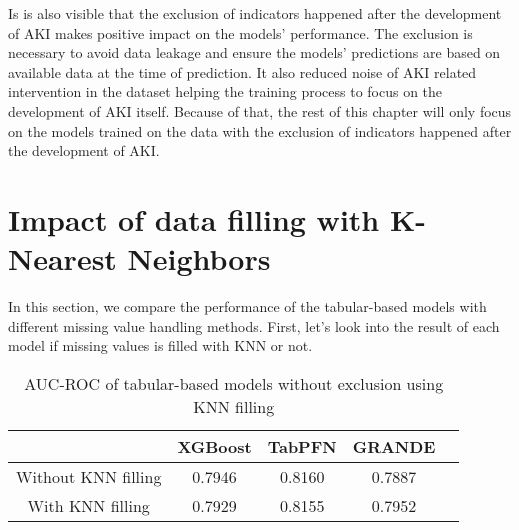 \documentclass[../main.tex]{subfiles}
\begin{document}
Is is also visible that the exclusion of indicators happened after the development of AKI makes positive impact on the models' performance.
The exclusion is necessary to avoid data leakage and ensure the models' predictions are based on available data at the time of prediction.
It also reduced noise of AKI related intervention in the dataset helping the training process to focus on the development of AKI itself.
Because of that, the rest of this chapter will only focus on the models trained on the data with the exclusion of indicators happened after the development of AKI.


\section{Impact of data filling with K-Nearest Neighbors}

In this section, we compare the performance of the tabular-based models with different missing value handling methods.
First, let's look into the result of each model if missing values is filled with KNN or not.

\begin{table}[H]
    \centering
    \caption{AUC-ROC of tabular-based models without exclusion using KNN filling}
    \label{tab:knn_filling_no_limit}

    \begin{tabular}{|c|c|c|c|c|}
        \hline
        \textbf{} & 
        \textbf{XGBoost} & 
        \textbf{TabPFN} & 
        \textbf{GRANDE} \\
        \hline

        Without KNN filling & 
        0.7946 & 
        0.8160 & 
        0.7887 \\

        With KNN filling & 
        0.7929 & 
        0.8155 & 
        0.7952 \\

        \hline
    \end{tabular}

\end{table}
\end{document}
